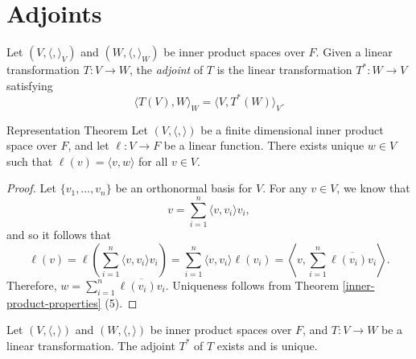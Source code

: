 \section{Adjoints}

\begin{defn}
    Let $(V, \langle, \rangle_V)$ and $(W, \langle, \rangle_W)$ be inner product spaces over $F$. Given a linear transformation $T: V \to W$, the \emph{adjoint} of $T$ is the linear transformation $T^{*}: W \to V$ satisfying \[\langle T(V), W\rangle_W = \langle V, T^{*}(W)\rangle_V.\]
\end{defn}

\begin{lemma}Representation Theorem\label{adjoint-representation-theorem}\proofbreak
    Let $(V, \langle,\rangle)$ be a finite dimensional inner product space over $F$, and let $\ell: V \to F$ be a linear function. There exists unique $w \in V$ such that $\ell(v) = \langle v, w \rangle$ for all $v \in V$.
\end{lemma}

\begin{proof}
    Let $\{v_1, \ldots, v_n\}$ be an orthonormal basis for $V$. For any $v \in V$, we know that
    \[v = \sum_{i=1}^{n}\langle v, v_i \rangle v_i,\]
    and so it follows that
    \[\ell(v) = \ell\left(\sum_{i=1}^{n}\langle v, v_i \rangle v_i\right) = \sum_{i=1}^{n}\langle v, v_i \rangle \ell(v_i) = \left\langle v, \sum_{i=1}^{n}\overline{\ell(v_i)v_i} \right\rangle.\]
    Therefore, $w = \sum_{i=1}^{n}\overline{\ell(v_i)v_i}$. Uniqueness follows from Theorem \ref{inner-product-properties} (5).
\end{proof}

\begin{thm}\label{adjoint-existence-uniqueness}
    Let $(V, \langle, \rangle)$ and $(W, \langle, \rangle)$ be inner product spaces over $F$, and $T: V \to W$ be a linear transformation. The adjoint $T^*$ of $T$ exists and is unique.
\end{thm}

